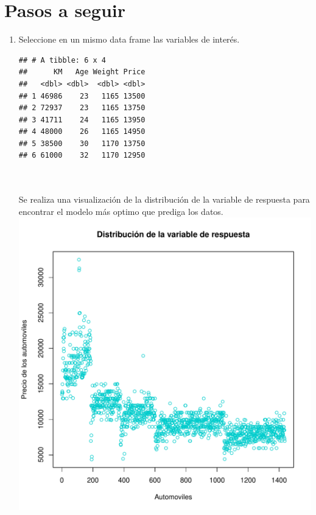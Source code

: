 \documentclass[11pt,letterpaper]{article}\usepackage[]{graphicx}\usepackage[]{color}
\makeatletter
\def\maxwidth{ %
  \ifdim\Gin@nat@width>\linewidth
    \linewidth
  \else
    \Gin@nat@width
  \fi
}
\newenvironment{kframe}{%
 \def\at@end@of@kframe{}%
 \ifinner\ifhmode%
  \def\at@end@of@kframe{\end{minipage}}%
  \begin{minipage}{\columnwidth}%
 \fi\fi%
 \def\FrameCommand##1{\hskip\@totalleftmargin \hskip-\fboxsep
 \colorbox{shadecolor}{##1}\hskip-\fboxsep
     \hskip-\linewidth \hskip-\@totalleftmargin \hskip\columnwidth}%
 \MakeFramed {\advance\hsize-\width
   \@totalleftmargin\z@ \linewidth\hsize
   \@setminipage}}%
 {\par\unskip\endMakeFramed%
 \at@end@of@kframe}
\newenvironment{knitrout}{}{} %
\makeatother
\begin{document}
\section*{\textbf{Pasos a seguir}}
\begin{enumerate}
    \item Seleccione en un mismo data frame las variables de interés.


\begin{knitrout}
\color{fgcolor}\begin{kframe}
\begin{verbatim}
## # A tibble: 6 x 4
##      KM   Age Weight Price
##   <dbl> <dbl>  <dbl> <dbl>
## 1 46986    23   1165 13500
## 2 72937    23   1165 13750
## 3 41711    24   1165 13950
## 4 48000    26   1165 14950
## 5 38500    30   1170 13750
## 6 61000    32   1170 12950
\end{verbatim}
\end{kframe}
\end{knitrout}

\\ \\
Se realiza una visualización de la distribución de la variable de respuesta para encontrar el modelo más optimo que prediga los datos.
\begin{knitrout}
\color{fgcolor}
\includegraphics[width=\maxwidth]{figure/unnamed-chunk-3-1} 


\end{knitrout}
\end{enumerate}
\end{document}
